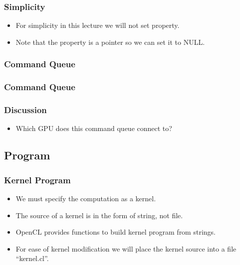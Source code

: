 \documentclass{beamer}
\begin{document}
\begin{frame}
  \frametitle{Simplicity}
  \begin{itemize}
  \item For simplicity in this lecture we will not set property.
  \item Note that the property is a pointer so we can set it to NULL.
  \end{itemize}
\end{frame}

\begin{frame}
  \frametitle{Command Queue}
\end{frame}

\begin{frame}
  \frametitle{Command Queue}
  \centerline{}
\end{frame}

\begin{frame}
  \frametitle{Discussion}
  \begin{itemize}
  \item Which GPU does this command queue connect to?
  \end{itemize}
\end{frame}

\subsection{Program}

\begin{frame}
  \frametitle{Kernel Program}
  \begin{itemize}
  \item We must specify the computation as a kernel.
  \item The source of a kernel is in the form of string, not file.
  \item OpenCL provides functions to build kernel program from strings.
  \item For ease of kernel modification we will place the kernel
    source into a file ``kernel.cl''.
  \end{itemize}
\end{frame}

\begin{frame}
\end{frame}
\end{document}
